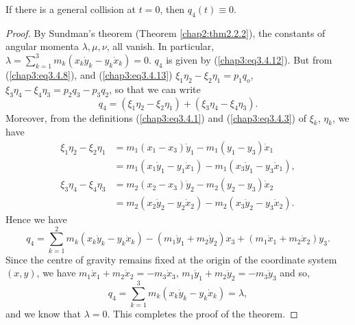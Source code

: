\setcounter{subtheorem}{0}
\begin{subtheorem}\label{chap3:thm3.4.1}
If there is a general collision at $t =0$, then $q_4(t) \equiv 0$.  
\end{subtheorem}

\begin{proof}
By Sundman's theorem (Theorem \ref{chap2:thm2.2.2}), the constants of
angular momenta $\lambda, \mu, \nu$, all vanish. In particular,
$\lambda = \sum\limits^3_{k=1} m_k (x_k \dot{y}_k - y_k \dot{x}_k) =
0$. $q_4$ is given by (\ref{chap3:eq3.4.12}). But from
(\ref{chap3:eq3.4.8}), and (\ref{chap3:eq3.4.13}) $\xi_1 \eta_2 -
\xi_2 \eta_1 = p_1 q_o$, $\xi_3 \eta_4 - \xi_4 \eta_3 = p_2 q_3 - p_3
q_2$, so that we can write 
$$
q_4 = (\xi_1 \eta_2 - \xi_2 \eta_1) + (\xi_3 \eta_4 - \xi_4 \eta_3). 
$$
Moreover, from the definitions (\ref{chap3:eq3.4.1}) and
(\ref{chap3:eq3.4.3}) of $\xi_k$, $\eta_k$, we have 
\begin{align*}
\xi_1 \eta_2 - \xi_2 \eta_1 & = m_1 (x_1 - x_3) \dot{y}_1 - m_1 (y_1 - y_3) \dot{x}_1 \\
& = m_1 (x_1 \dot{y}_1 - y_1 \dot{x}_1) - m_1 (x_3 \dot{y}_1 - y_3 \dot{x}_1),\\[5pt]
\xi_3 \eta_4 - \xi_4 \eta_3 & = m_2 (x_2 -x_3) \dot{y}_2 - m_2 (y_2 - y_3) \dot{x}_2\\
& = m_2 (x_2 \dot{y}_2 - y_2 \dot{x}_2) - m_2 (x_3 \dot{y}_2 - y_3 \dot{x}_2). 
\end{align*}
Hence we have 
$$
q_4 = \sum\limits^2_{k=1} m_k (x_k \dot{y}_k - y_k \dot{x}_k) - (m_1
\dot{y}_1 + m_2 \dot{y}_2) x_3 + (m_1 \dot{x}_1 + m_2 \dot{x}_2) y_3.  
$$\pageoriginale
Since the centre of gravity remains fixed at the origin of the
coordinate system $(x,y)$, we have $m_1 \dot{x}_1 + m_2 \dot{x}_2 = -
m_3 \dot{x}_3$, $m_1 \dot{y}_1+ m_2 \dot{y}_2 = - m_3 \dot{y}_3$ and
so,  
$$
q_4 = \sum\limits^3_{k=1} m_k (x_k \dot{y}_k - y_k \dot{x}_k) = \lambda, 
$$
and we know that $\lambda=0$. This completes the proof of the theorem.


\end{proof}
